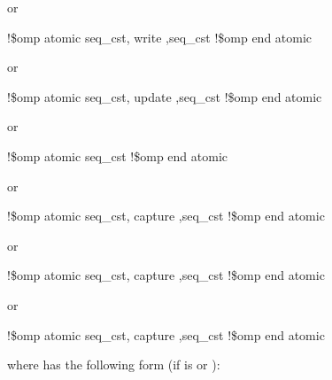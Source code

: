 \pagebreak
\begin{figure}[t!]
\end{figure}
or

\begin{boxedcode}
!\$omp atomic \plc{[}seq\_cst\plc{[},\plc{]]} write \plc{[[},\plc{]}seq\_cst\plc{]}
\plc{[}!\$omp end atomic\plc{]}
\end{boxedcode}

or

\begin{boxedcode}
!\$omp atomic \plc{[}seq\_cst\plc{[},\plc{]]} update \plc{[[},\plc{]}seq\_cst\plc{]}
\plc{[}!\$omp end atomic\plc{]}
\end{boxedcode}

or

\begin{boxedcode}
!\$omp atomic \plc{[}seq\_cst\plc{]} 
\plc{[}!\$omp end atomic\plc{]}
\end{boxedcode}

or

\begin{boxedcode}
!\$omp atomic \plc{[}seq\_cst\plc{[},\plc{]]} capture \plc{[[},\plc{]}seq\_cst\plc{]}
!\$omp end atomic
\end{boxedcode}

or

\begin{boxedcode}
!\$omp atomic \plc{[}seq\_cst\plc{[},\plc{]]} capture \plc{[[},\plc{]}seq\_cst\plc{]}
!\$omp end atomic
\end{boxedcode}

or

\begin{boxedcode}
!\$omp atomic \plc{[}seq\_cst\plc{[},\plc{]]} capture \plc{[[},\plc{]}seq\_cst\plc{]}
!\$omp end atomic
\end{boxedcode}

where  has the following form (if  
is  or ):

\begin{quote}
\end{quote}

